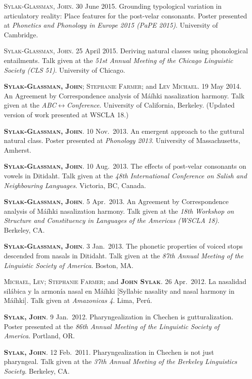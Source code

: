 \documentclass[11pt]{article}
\renewcommand{\bf}[1]{\textbf{#1}}
\newcommand{\ca}[1]{\textsc{#1}}
\renewcommand{\it}[1]{\textit{#1}}
\newcommand{\dotlessbari}{\ipabar{{\tipaencoding \i}}{.5ex}{1.1}{}{}}		%
\newcommand{\nI}{\tipaupperaccent{3}{\dotlessbari}}	%
\begin{document}
\begin{reflist}
\ca{Sylak-Glassman, John}. 30 June 2015. Grounding typological variation in articulatory reality: Place features for the post-velar consonants. Poster presented at \it{Phonetics and Phonology in Europe 2015 (PaPE 2015)}. University of Cambridge. 

\ca{Sylak-Glassman, John}. 25 April 2015. Deriving natural classes using phonological entailments. Talk given at the \it{51st Annual Meeting of the Chicago Linguistic Society (CLS 51)}. University of Chicago.

\ca{\bf{Sylak-Glassman, John}; Stephanie Farmer;} and \ca{Lev Michael}. 19 May 2014. An Agreement by Correspondence analysis of M\'a\'ih\nI ki nasalization harmony. Talk given at the \it{ABC$\leftrightarrow$Conference}. University of California, Berkeley. (Updated version of work presented at WSCLA 18.)

\ca{\bf{Sylak-Glassman, John}}. 10 Nov.~2013. An emergent approach to the guttural natural class. Poster presented at \it{Phonology 2013}. University of Massachusetts, Amherst.

\ca{\bf{Sylak-Glassman, John}}. 10 Aug.~2013. The effects of post-velar consonants on vowels in Ditidaht. Talk given at the \it{48th International Conference on Salish and Neighbouring Languages}. Victoria, BC, Canada.

\ca{\bf{Sylak-Glassman, John}}. 5 Apr.~2013. An Agreement by Correspondence analysis of M\'a\'ih\nI ki nasalization harmony. Talk given at the \it{18th Workshop on Structure and Constituency in Languages of the Americas (WSCLA 18)}. Berkeley, CA.

\ca{\bf{Sylak-Glassman, John}}. 3 Jan.~2013. The phonetic properties of voiced stops descended from nasals in Ditidaht. Talk given at the \it{87th Annual Meeting of the Linguistic Society of America}. Boston, MA. 

\ca{Michael, Lev; Stephanie Farmer;} and \ca{\bf{John Sylak}}. 26 Apr.~2012. La nasalidad sil\'abica y la armon\'ia nasal en M\'a\'ih\textbari ki [Syllabic nasality and nasal harmony in M\'a\'ih\textbari ki]. Talk given at \it{Amazonicas 4}. Lima, Per\'u.

\ca{\bf{Sylak, John}}. 9 Jan.~2012. Pharyngealization in Chechen is gutturalization. Poster presented at the \it{86th Annual Meeting of the Linguistic Society of America}. Portland, OR.

\ca{\bf{Sylak, John}}. 12 Feb.~2011. Pharyngealization in Chechen is not just pharyngeal. Talk given at the \it{37th Annual Meeting of the Berkeley Linguistics Society}. Berkeley, CA.


\end{reflist}
\end{document}
